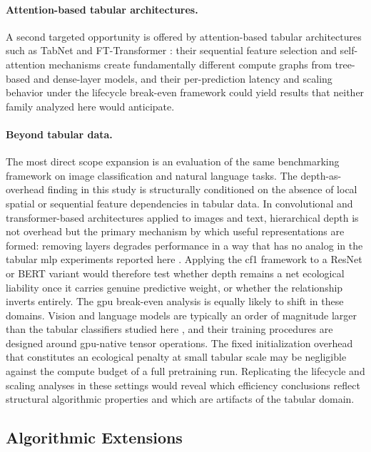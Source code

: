 \paragraph{Attention-based tabular architectures.}
A second targeted opportunity is offered by attention-based tabular architectures such as TabNet \cite{arikTabNetAttentiveInterpretable2021} and FT-Transformer \cite{gorishniyRevisitingDeepLearning2021a}: their sequential feature selection and self-attention mechanisms create fundamentally different compute graphs from tree-based and dense-layer models, and their per-prediction latency and scaling behavior under the lifecycle break-even framework could yield results that neither family analyzed here would anticipate.

\paragraph{Beyond tabular data.}
The most direct scope expansion is an evaluation of the same benchmarking framework on image classification and natural language tasks. The depth-as-overhead finding in this study is structurally conditioned on the absence of local spatial or sequential feature dependencies in tabular data. In convolutional and transformer-based architectures applied to images and text, hierarchical depth is not overhead but the primary mechanism by which useful representations are formed: removing layers degrades performance in a way that has no analog in the tabular \gls{mlp} experiments reported here \cite{grinsztajnWhyTreebasedModels2022a}. Applying the \gls{cf1} framework to a ResNet or BERT variant would therefore test whether depth remains a net ecological liability once it carries genuine predictive weight, or whether the relationship inverts entirely. The \gls{gpu} break-even analysis is equally likely to shift in these domains. Vision and language models are typically an order of magnitude larger than the tabular classifiers studied here \cite{pattersonCarbonEmissionsLarge2021}, and their training procedures are designed around \gls{gpu}-native tensor operations. The fixed initialization overhead that constitutes an ecological penalty at small tabular scale may be negligible against the compute budget of a full pretraining run. %
Replicating the lifecycle and scaling analyses in these settings would reveal which efficiency conclusions reflect structural algorithmic properties and which are artifacts of the tabular domain.

\subsection{Algorithmic Extensions}

